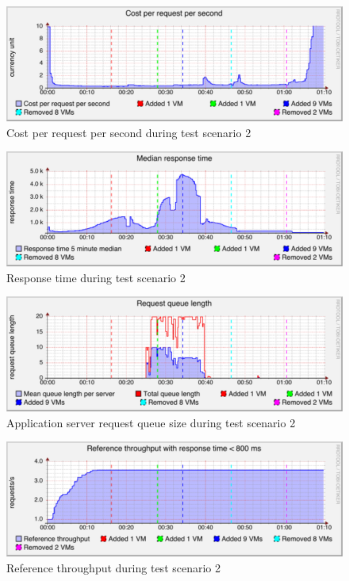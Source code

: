 \documentclass[english]{tktltiki2}
\theoremstyle{definition}
\theoremstyle{remark}
\begin{document}
\begin{figure}[htbp]
	\includegraphics[width=\textwidth]{images/costperrequestpersecondgraph-test23}
	\caption{Cost per request per second during test scenario 2}
	\label{fig:costScenario2}
\end{figure}

\begin{figure}[htbp]
	\includegraphics[width=\textwidth]{images/responsetimegraph-test23}
	\caption{Response time during test scenario 2}
	\label{fig:responseTimeScenario2}
\end{figure}

\begin{figure}[htbp]
	\includegraphics[width=\textwidth]{images/queuesizegraph-test23}
	\caption{Application server request queue size during test scenario 2}
	\label{fig:queueScenario2}
\end{figure}

\begin{figure}[htbp]
	\includegraphics[width=\textwidth]{images/referencethroughputgraph-test23}
	\caption{Reference throughput during test scenario 2}
	\label{fig:referenceThroughputScenario2}
\end{figure}
\end{document}
